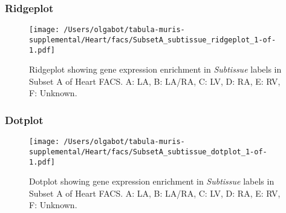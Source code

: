 \clearpage

\subsubsection{Ridgeplot}
\begin{figure}[h]
\centering
\texttt{[image: /Users/olgabot/tabula-muris-supplemental/Heart/facs/SubsetA\_subtissue\_ridgeplot\_1-of-1.pdf]}

\caption{ Ridgeplot  showing gene expression enrichment in \emph{Subtissue} labels in Subset A of Heart FACS. A: LA, B: LA/RA, C: LV, D: RA, E: RV, F: Unknown.}
\end{figure}


\clearpage

\subsubsection{Dotplot}
\begin{figure}[h]
\centering
\texttt{[image: /Users/olgabot/tabula-muris-supplemental/Heart/facs/SubsetA\_subtissue\_dotplot\_1-of-1.pdf]}

\caption{ Dotplot  showing gene expression enrichment in \emph{Subtissue} labels in Subset A of Heart FACS. A: LA, B: LA/RA, C: LV, D: RA, E: RV, F: Unknown.}
\end{figure}

